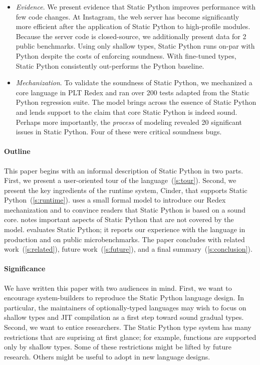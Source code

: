 \documentclass[english,cleveref,submission]{programming}
\newcommand{\SP}{Static Python}
\newcommand{\numbenchmark}{2}
\begin{document}
\begin{itemize}
  \item
    \emph{Evidence}.
    We present evidence that \SP{} improves performance with few code changes.
    At Instagram, the web server has become significantly more efficient
    after the application of \SP{} to high-profile modules.
    Because the server code is closed-source, we additionally present data for
    \numbenchmark{} public benchmarks.
    Using only shallow types, \SP{} runs on-par with Python despite the costs of
    enforcing soundness.
    With fine-tuned types, \SP{} consistently out-performs the Python baseline.

  \item
    \emph{Mechanization}.
    To validate the soundness of \SP{}, we mechanized a core language in PLT Redex
    and ran over 200 tests adapted from the \SP{} regression suite.
    The model brings across the essence of \SP{} and lends support to the claim
    that core \SP{} is indeed sound.
    Perhaps more importantly, the \emph{process} of modeling revealed 20 significant
    issues in \SP{}.
    Four of these were critical soundness bugs.

\end{itemize}

\paragraph*{Outline}

This paper begins with an informal description of \SP{} in two parts.
First, we present a user-oriented tour of the language~(\cref{s:tour}).
Second, we present the key ingredients of the runtime system, Cinder,
that supports \SP{}~(\cref{s:runtime}).
 uses a small formal model to introduce our Redex mechanization
and to convince readers that \SP{} is based on a sound core.
 notes important aspects of \SP{} that are not covered by the model.
 evaluates \SP{}; it reports our experience with the language in
production and on public microbenchmarks.
The paper concludes with related work~(\cref{s:related}),
future work~(\cref{s:future}), and a final summary~(\cref{s:conclusion}).


\paragraph*{Significance}

We have written this paper with two audiences in mind.
First, we want to encourage system-builders to reproduce the
\SP{} language design.
In particular, the maintainers of optionally-typed languages
may wish to focus on shallow types and JIT compilation as a
first step toward sound gradual types.
Second, we want to entice researchers.
The \SP{} type system has many restrictions that are suprising
at first glance; for example, functions are supported only by
shallow types.
Some of these restrictions might be lifted by future research.
Others might be useful to adopt in new language designs.
\end{document}
